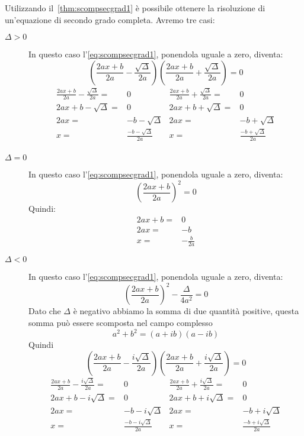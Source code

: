\begin{commento}
	Utilizzando il~\cref{thm:scompsecgrad1} è possibile ottenere la risoluzione di un'equazione di secondo grado completa. Avremo tre casi:
	\begin{description}
		\item[$\Delta>0$]In questo caso l'\cref{eq:scompsecgrad1}, ponendola uguale a zero, diventa:  
		\begin{equation*}
		\left(\frac{2ax+b}{2a}-\frac{\sqrt{\Delta}}{2a}\right)\left(\frac{2ax+b}{2a}+\frac{\sqrt{\Delta}}{2a}\right)=0
		\end{equation*}
		\begin{align*}
		\frac{2ax+b}{2a}-\frac{\sqrt{\Delta}}{2a}=&0&\frac{2ax+b}{2a}+\frac{\sqrt{\Delta}}{2a}=&0\\
		2ax+b-\sqrt{\Delta}=&0&2ax+b+\sqrt{\Delta}=&0\\
		2ax=&-b-\sqrt{\Delta}&2ax=&-b+\sqrt{\Delta}\\
		x=&\frac{-b-\sqrt{\Delta}}{2a}&x=&\frac{-b+\sqrt{\Delta}}{2a}\\
		\end{align*}
	\item[$\Delta=0$]In questo caso l'\cref{eq:scompsecgrad1}, ponendola uguale a zero, diventa:
	\begin{equation}
	\left(\dfrac{2ax+b}{2a}\right)^2=0
	\end{equation}Quindi:
	\begin{align*}
	2ax+b=&0\\
	2ax=&-b\\
	x=&-\frac{b}{2a}
	\end{align*}
	\item[$\Delta<0$]In questo caso l'\cref{eq:scompsecgrad1}, ponendola uguale a zero, diventa:
	\begin{equation*}
	\left(\dfrac{2ax+b}{2a}\right)^2-\dfrac{\Delta}{4a^2}=0
	\end{equation*}
	Dato che $\Delta$ è negativo abbiamo la somma di due quantità positive, questa somma può essere scomposta nel campo complesso \[a^2+b^2=(a+ib)(a-ib)\] Quindi
	\begin{equation*}
	\left(\frac{2ax+b}{2a}-\frac{i\sqrt{\Delta}}{2a}\right)\left(\frac{2ax+b}{2a}+\frac{i\sqrt{\Delta}}{2a}\right)=0
	\end{equation*}
		\begin{align*}
	\frac{2ax+b}{2a}-\frac{i\sqrt{\Delta}}{2a}=&0&\frac{2ax+b}{2a}+\frac{i\sqrt{\Delta}}{2a}=&0\\
	2ax+b-i\sqrt{\Delta}=&0&2ax+b+i\sqrt{\Delta}=&0\\
	2ax=&-b-i\sqrt{\Delta}&2ax=&-b+i\sqrt{\Delta}\\
	x=&\frac{-b-i\sqrt{\Delta}}{2a}&x=&\frac{-b+i\sqrt{\Delta}}{2a}\\
	\end{align*}
	\end{description}
\end{commento}
